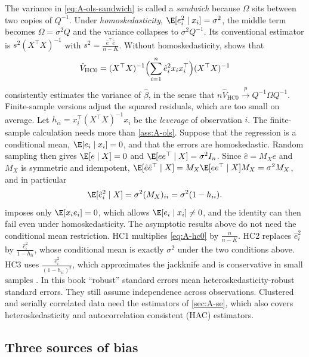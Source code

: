 The variance in \eqref{eq:A-ols-sandwich} is called a \emph{sandwich} because $\Omega$ sits between two
copies of $Q^{-1}$. Under \emph{homoskedasticity}, $\E[e_i^2 \mid x_i] = \sigma^2$, the middle term becomes
$\Omega = \sigma^2Q$ and the variance collapses to $\sigma^2Q^{-1}$. Its conventional estimator is
$s^2(X^\top X)^{-1}$ with $s^2 = \frac{\hat e^\top\hat e}{n - K}$. Without homoskedasticity,
\citet{White1980} shows that
\begin{equation}\label{eq:A-hc0}
\hat V_{\mathrm{HC0}} = (X^\top X)^{-1}\Bigl(\sum_{i=1}^n\hat e_i^2x_ix_i^\top\Bigr)(X^\top X)^{-1}
\end{equation}
consistently estimates the variance of $\hat\beta$, in the sense that $n\hat V_{\mathrm{HC0}}
\xrightarrow{p} Q^{-1}\Omega Q^{-1}$. Finite-sample versions adjust the squared residuals, which are too
small on average. Let $h_{ii} = x_i^\top(X^\top X)^{-1}x_i$ be the \emph{leverage} of observation $i$. The
finite-sample calculation needs more than \cref{ass:A-ols}. Suppose that the regression is a conditional mean,
$\E[e_i \mid x_i] = 0$, and that the errors are homoskedastic. Random sampling then gives $\E[e \mid X] = 0$ and
$\E[ee^\top \mid X] = \sigma^2I_n$. Since $\hat e = M_Xe$ and $M_X$ is symmetric and idempotent,
$\E[\hat e\hat e^\top \mid X] = M_X\E[ee^\top \mid X]M_X = \sigma^2M_X$, and in particular
\begin{equation*}
\E[\hat e_i^2 \mid X] = \sigma^2(M_X)_{ii} = \sigma^2(1 - h_{ii}) .
\end{equation*}
 imposes only $\E[x_ie_i] = 0$, which allows $\E[e_i \mid x_i] \ne 0$, and the identity can then
fail even under homoskedasticity. The asymptotic results above do not need the conditional mean restriction.
HC1 multiplies \eqref{eq:A-hc0} by $\frac{n}{n - K}$. HC2 replaces $\hat e_i^2$ by $\frac{\hat e_i^2}{1 - h_{ii}}$,
whose conditional mean is exactly $\sigma^2$ under the two conditions above. HC3 uses $\frac{\hat e_i^2}{(1 - h_{ii})^2}$, which approximates the
jackknife and is conservative in small samples \citep{MacKinnonWhite1985}. In this book ``robust'' standard
errors mean heteroskedasticity-robust standard errors. They still assume independence across observations.
Clustered and serially correlated data need the estimators of \cref{sec:A-se}, which also covers heteroskedasticity
and autocorrelation consistent (HAC) estimators.

\subsection{Three sources of bias}\label{sec:A-bias}

